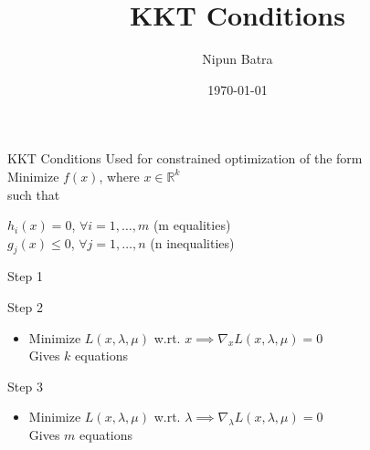\documentclass{beamer}
\title{KKT Conditions}
\date{\today}
\author{Nipun Batra}
\institute{IIT Gandhinagar}
\begin{document}
	\maketitle

	\begin{frame}{KKT Conditions}
	Used for constrained optimization of the form\\
	\vspace{1cm}
	Minimize $f(x)$, where $x \in \mathbb{R}^k$\\
	such that\\
	\begin{center}
	$h_i(x) = 0$,  $\forall i = 1, \dots, m$ (m equalities)\\
	$g_j(x) \leq 0$,  $\forall j = 1, \dots, n$ (n inequalities)\\
	\end{center}
	\end{frame}

	\begin{frame}{Step 1}
	\begin{itemize}
	\end{itemize}
	\end{frame}

	\begin{frame}{Step 2}
	\begin{itemize}
	\item Minimize $L(x, \lambda, \mu)$ w.rt. $x \implies \nabla_xL(x, \lambda, \mu) = 0 $\\
	Gives $k$ equations
	\end{itemize}
	\end{frame}

	\begin{frame}{Step 3}
	\begin{itemize}
	\item Minimize $L(x, \lambda, \mu)$ w.rt. $\lambda \implies \nabla_\lambda L(x, \lambda, \mu) = 0 $\\
	Gives $m$ equations
	\end{itemize}
	\end{frame}
\end{document}
